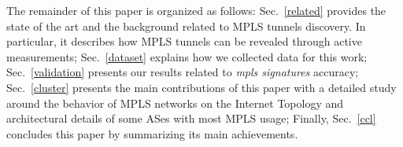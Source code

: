 The remainder of this paper is organized as follows: Sec.~\ref{related} provides
the state of the art and the background related to MPLS tunnels discovery. In
particular, it describes how MPLS tunnels can be revealed through active
measurements;  Sec.~\ref{dataset} explains how we collected data for this work;
Sec.~\ref{validation} presents our results related to \textit{mpls signatures}
accuracy; Sec.~\ref{cluster} presents the main contributions of this paper with
a detailed study around the behavior of MPLS networks on the Internet Topology
and architectural details of some ASes with most MPLS usage; Finally,
Sec.~\ref{ccl} concludes this paper by summarizing its main achievements.

